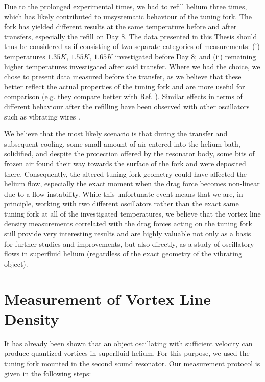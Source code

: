 Due to the prolonged experimental times, we had to refill helium three times, which has likely contributed to unsystematic behaviour of the tuning fork. The fork has yielded different results at the same temperature before and after transfers, especially the refill on Day 8. The data presented in this Thesis should thus be considered as if consisting of two separate categories of measurements: (i) temperatures $ 1.35\unit{K} $, $ 1.55\unit{K} $, $ 1.65\unit{K} $ investigated before Day 8; and (ii) remaining higher temperatures investigated after said transfer. Where we had the choice, we chose to present data measured before the transfer, as we believe that these better reflect the actual properties of the tuning fork and are more useful for comparison (e.g. they compare better with Ref. \cite{lancaster}). Similar effects in terms of different behaviour after the refilling have been observed with other oscillators such as vibrating wires \cite{history}.

We believe that the most likely scenario is that during the transfer and subsequent cooling, some small amount of air entered into the helium bath, solidified, and despite the protection offered by the resonator body, some bits of frozen air found their way towards the surface of the fork and were deposited there. Consequently, the altered tuning fork geometry could have affected the helium flow, especially the exact moment when the drag force becomes non-linear due to a flow instability. While this unfortunate event means that we are, in principle, working with two different oscillators rather than the exact same tuning fork at all of the investigated temperatures, we believe that the vortex line density measurements correlated with the drag forces acting on the tuning fork still provide very interesting results and are highly valuable not only as a basis for further studies and improvements, but also directly, as a study of oscillatory flows in superfluid helium (regardless of the exact geometry of the vibrating object).


\section{Measurement of Vortex Line Density}

It has already been shown that an object oscillating with sufficient velocity can produce quantized vortices in superfluid helium. For this purpose, we used the tuning fork mounted in the second sound resonator. Our measurement protocol is given in the following steps:

